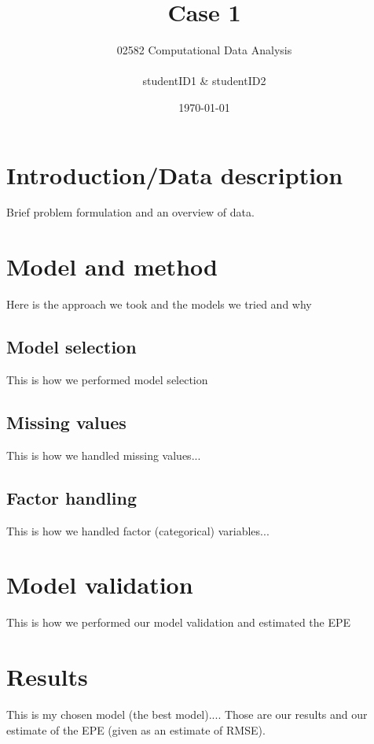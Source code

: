 \documentclass{article}
\title{Case 1}
\author{02582 Computational Data Analysis \\ \\ studentID1 \& studentID2}
\date{\today}
\begin{document}
\maketitle
\section*{Introduction/Data description}
Brief problem formulation and an overview of data.
\section*{Model and method}
Here is the approach we took and the models we tried and why

\subsection*{Model selection}
This is how we performed model selection
\subsection*{Missing values}
This is how we handled missing values...
\subsection*{Factor handling}
This is how we handled factor (categorical) variables...

\section*{Model validation}
This is how we performed our model validation and estimated the EPE

\section*{Results}
This is my chosen model (the best model)....
Those are our results and our estimate of the EPE (given as
an estimate of RMSE).
\end{document}
